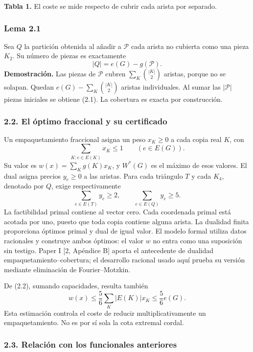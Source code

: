 \documentclass[spanish,11pt,a4paper]{article}
\begin{document}
\textbf{Tabla 1.} El coste se mide respecto de cubrir cada arista por separado.

\subsubsection{Lema 2.1}\label{lema-2.1}

Sea \(Q\) la partición obtenida al añadir a \(\mathcal P\) cada arista no cubierta como una pieza \(K_2\). Su número de piezas es exactamente \[
|Q|=e(G)-g(\mathcal P).
\tag{2.1}
\] \textbf{Demostración.} Las piezas de \(\mathcal P\) cubren \(\sum_K\binom{|K|}{2}\) aristas, porque no se solapan. Quedan \(e(G)-\sum_K\binom{|K|}{2}\) aristas individuales. Al sumar las \(|\mathcal P|\) piezas iniciales se obtiene (2.1). La cobertura es exacta por construcción.

\subsubsection{2.2. El óptimo fraccional y su certificado}\label{el-optimo-fraccional-y-su-certificado}

Un empaquetamiento fraccional asigna un peso \(x_K\ge0\) a cada copia real \(K\), con \[
\sum_{K:e\in E(K)}x_K\le1\qquad(e\in E(G)).
\tag{2.2}
\] Su valor es \(w(x)=\sum_K g(K)x_K\), y \(W^*(G)\) es el máximo de esos valores. El dual asigna precios \(y_e\ge0\) a las aristas. Para cada triángulo \(T\) y cada \(K_4\), denotado por \(Q\), exige respectivamente \[
\sum_{e\in E(T)}y_e\ge2,\qquad
\sum_{e\in E(Q)}y_e\ge5.
\tag{2.3}
\] La factibilidad primal contiene al vector cero. Cada coordenada primal está acotada por uno, puesto que toda copia contiene alguna arista. La dualidad finita proporciona óptimos primal y dual de igual valor. El modelo formal utiliza datos racionales y construye ambos óptimos: el valor \(w\) no entra como una suposición sin testigo. Paper I {[}2, Apéndice B{]} aporta el antecedente de dualidad empaquetamiento--cobertura; el desarrollo racional usado aquí prueba su versión mediante eliminación de Fourier--Motzkin.

De (2.2), sumando capacidades, resulta también \[
w(x)\le\frac56\sum_K |E(K)|x_K\le\frac56e(G).
\tag{2.4}
\] Esta estimación controla el coste de reducir multiplicativamente un empaquetamiento. No es por sí sola la cota extremal cordal.

\subsubsection{2.3. Relación con los funcionales anteriores}\label{relacion-con-los-funcionales-anteriores}
\end{document}
